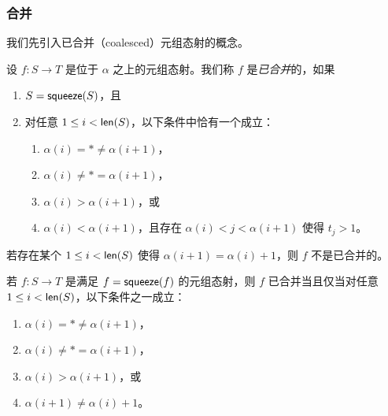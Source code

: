 \subsubsection{合并}
\label{subsubsection.coalesce}

\noindent 我们先引入已合并（coalesced）元组态射的概念。
\begin{definition}\label{definitionofcoalescedmorphisminC}
    设 $f:S \to T$ 是位于 $\alpha$ 之上的元组态射。我们称 $f$ 是{\it 已合并}的，如果
    \begin{enumerate}
        \item $S = \mathsf{squeeze}(S)$，且
        \item 对任意 $ 1 \leq i < \mathsf{len}(S)$，以下条件中恰有一个成立：
        \begin{enumerate}
            \item $\alpha(i) = * \neq \alpha(i+1)$，
            \item $\alpha(i) \neq *=\alpha(i+1)$，
            \item $\alpha(i) > \alpha(i+1)$，或
            \item $\alpha(i)<\alpha(i+1)$，且存在 $ \alpha(i) < j < \alpha(i+1)$ 使得 $t_j > 1$。
        \end{enumerate}
    \end{enumerate}
\end{definition}

\begin{example}
    若存在某个 $1 \leq i < \mathsf{len}(S)$ 使得 $\alpha(i+1) = \alpha(i)+1$，则 $f$ 不是已合并的。
\end{example}

\begin{remark}
    若 $f:S \to T$ 是满足 $f = \mathsf{squeeze}(f)$ 的元组态射，则 $f$ 已合并当且仅当对任意 $1 \leq i < \mathsf{len}(S)$，以下条件之一成立：
    \begin{enumerate}
            \item $\alpha(i) = * \neq \alpha(i+1)$，
            \item $\alpha(i) \neq * = \alpha(i+1)$，
            \item $\alpha(i) > \alpha(i+1)$，或
            \item $\alpha(i+1) \neq \alpha(i) + 1$。
    \end{enumerate}
\end{remark}

